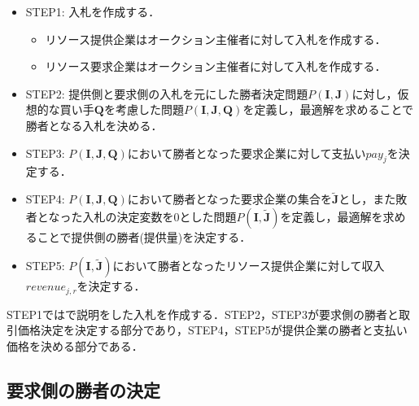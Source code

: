 \begin{itemize}
\tightlist
\item
  STEP1: 入札を作成する．

  \begin{itemize}
  \tightlist
  \item
    リソース提供企業はオークション主催者に対して入札を作成する．
  \item
    リソース要求企業はオークション主催者に対して入札を作成する．
  \end{itemize}
\item
  STEP2:
  提供側と要求側の入札を元にした勝者決定問題\(P(\boldsymbol{I},\boldsymbol{J})\)に対し，仮想的な買い手\(\boldsymbol{Q}\)を考慮した問題\(P(\boldsymbol{I},\boldsymbol{J},\boldsymbol{Q})\)を定義し，最適解を求めることで勝者となる入札を決める．
\item
  STEP3:
  \(P(\boldsymbol{I},\boldsymbol{J},\boldsymbol{Q})\)において勝者となった要求企業に対して支払い\(pay_j\)を決定する．
\item
  STEP4:
  \(P(\boldsymbol{I},\boldsymbol{J},\boldsymbol{Q})\)において勝者となった要求企業の集合を\(\boldsymbol{\tilde{J}}\)とし，また敗者となった入札の決定変数を0とした問題\(P(\boldsymbol{I},\boldsymbol{\tilde{J}})\)を定義し，最適解を求めることで提供側の勝者(提供量)を決定する．
\item
  STEP5:
  \(P(\boldsymbol{I},\boldsymbol{\tilde{J}})\)において勝者となったリソース提供企業に対して収入\(revenue_{j,r}\)を決定する．
\end{itemize}

STEP1ではで説明をした入札を作成する．STEP2，STEP3が要求側の勝者と取引価格決定を決定する部分であり，STEP4，STEP5が提供企業の勝者と支払い価格を決める部分である．

\hypertarget{ux8981ux6c42ux5074ux306eux52ddux8005ux306eux6c7aux5b9a}{%
\subsection{要求側の勝者の決定}\label{ux8981ux6c42ux5074ux306eux52ddux8005ux306eux6c7aux5b9a}}

